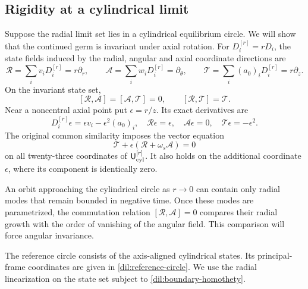 \documentclass[11pt,a4paper]{article}
\numberwithin{equation}{section}
\theoremstyle{plain}
\theoremstyle{definition}
\theoremstyle{remark}
\begin{document}
\subsection{Rigidity at a cylindrical limit}

Suppose the radial limit set lies in a cylindrical equilibrium circle.
We will show that the continued germ is invariant under axial
rotation. For $D_i^{[r]}=rD_i$, the state fields induced by the
radial, angular and axial coordinate directions are
\begin{equation}\label{dil:RAB}
 \mathcal R=\sum_iv_iD_i^{[r]}=r\partial_r,\qquad
 \mathcal A=\sum_iw_iD_i^{[r]}=\partial_\theta,\qquad
 \mathcal T=\sum_i(a_0)_iD_i^{[r]}=r\partial_z.
\end{equation}
On the invariant state set,
\begin{equation}\label{dil:RAB-brackets}
 [\mathcal R,\mathcal A]=[\mathcal A,\mathcal T]=0,\qquad
 [\mathcal R,\mathcal T]=\mathcal T.
\end{equation}
Near a noncentral axial point put $\epsilon=r/z$.  Its exact derivatives
are
\begin{equation}\label{dil:axis-ratio-derivatives}
 D_i^{[r]}\epsilon=\epsilon v_i-\epsilon^2(a_0)_i,\quad
 \mathcal R\epsilon=\epsilon,\quad
 \mathcal A\epsilon=0,\quad\mathcal T\epsilon=-\epsilon^2.
\end{equation}
The original common similarity imposes the vector equation
\begin{equation}\label{dil:boundary-homothety}
       \mathcal T+\epsilon(\mathcal R+\omega_s\mathcal A)=0
\end{equation}
on all twenty-three coordinates of $\mathsf U_{\rm cyl}^{[r]}$.
It also holds on the additional coordinate $\epsilon$, where its component
is identically zero.

An orbit approaching the cylindrical circle as $r\to0$ can contain
only radial modes that remain bounded in negative time. Once these
modes are parametrized, the commutation relation
$[\mathcal R,\mathcal A]=0$ compares their radial growth with the
order of vanishing of the angular field. This comparison will force
angular invariance.

The reference circle consists of the axis-aligned cylindrical
states. Its principal-frame coordinates are given in
\eqref{dil:reference-circle}. We use the radial linearization on the
state set subject to \eqref{dil:boundary-homothety}.
\end{document}
